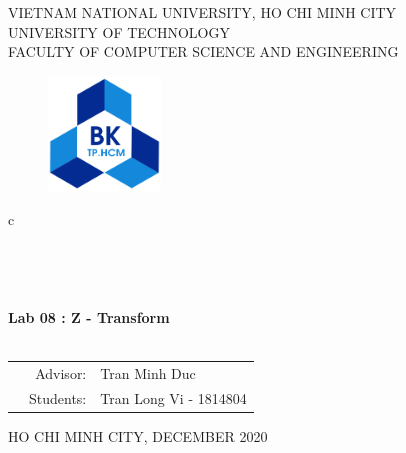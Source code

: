 \documentclass[13pt,a4paper]{article}
\begin{document}
	
	\begin{titlepage}
		\begin{center}
			VIETNAM NATIONAL UNIVERSITY, HO CHI MINH CITY \\
			UNIVERSITY OF TECHNOLOGY \\
			FACULTY OF COMPUTER SCIENCE AND ENGINEERING
		\end{center}
		
		\vspace{1cm}
		
		\begin{figure}[h!]
			\begin{center}
				\includegraphics[width=3cm]{hcmut.png}
			\end{center}
		\end{figure}
		
		\vspace{1cm}
		
		\begin{center}
			\color{blue}
			\begin{tabular}{c}
				\\
				~~\\
				\hline
				\\
				\\
				\\
				\textbf{{\Huge Lab 08 : Z - Transform}}\\
				\\
				\hline
			\end{tabular}
			\color{blue}
		\end{center}
		\vspace{1cm}
		
		\begin{table}[h]
			\color{blue}
			\begin{tabular}{rrl}
				\hspace{5 cm} & Advisor: & Tran Minh Duc\\
				& Students: & Tran Long Vi - 1814804 \\
			\end{tabular}
			\color{blue}
		\end{table}
		
		\vspace{4 cm}
		\begin{center}
			{\footnotesize\large HO CHI MINH CITY, DECEMBER 2020}
		\end{center}
	\end{titlepage}
	
\end{document}
